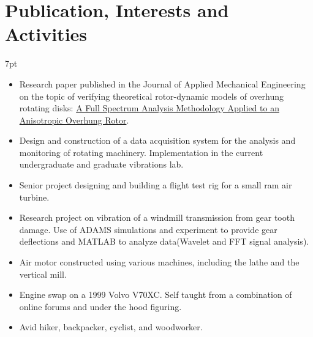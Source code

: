 \documentclass[10pt]{article} %
\begin{document}
\section{ Publication, Interests and Activities}
\begin{adjustwidth}{}{7pt}
\begin{itemize}
	
	\item \footnotesize{Research paper published in the Journal of Applied Mechanical Engineering on the topic of verifying theoretical rotor-dynamic models of overhung rotating disks: \href{https://www.omicsgroup.org/journals/a-full-spectrum-analysis-methodology-applied-to-an-anisotropic-overhung-rotor-2168-9873-1000232.php?aid=81544}{A Full Spectrum Analysis Methodology Applied to an Anisotropic Overhung Rotor}}.
	\item \footnotesize{Design and construction of a data acquisition system for the analysis and  monitoring of rotating machinery. Implementation in the current undergraduate and graduate vibrations lab. }
	\item \footnotesize{Senior project designing and building a flight test rig for a small ram air turbine.}
	\item \footnotesize{Research project on vibration of a windmill transmission from gear tooth damage. Use of ADAMS simulations and experiment to provide gear deflections and MATLAB to analyze data(Wavelet and FFT signal analysis).}
	\item \footnotesize{Air motor constructed using various machines, including the lathe and the vertical mill.}
	\item \footnotesize{Engine swap on a 1999 Volvo V70XC. Self taught from a combination of online forums and under the hood figuring. }
	\item\footnotesize{Avid hiker, backpacker, cyclist, and woodworker.}

\end{itemize}
\end{adjustwidth}
\end{document}
